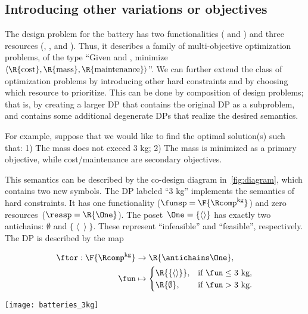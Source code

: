\subsection{Introducing other variations or objectives}

The design problem for the battery has two functionalities (
and ) and three resources (, ,
and ). Thus, it describes a family of multi-objective
optimization problems, of the type ``Given  and ,
minimize $\left\langle \R{\text{cost}},\R{\text{mass}},\R{\text{maintenance}}\right\rangle $''.
We can further extend the class of optimization problems by introducing
other hard constraints and by choosing which resource to prioritize.
This can be done by composition of design problems; that is, by creating
a larger DP that contains the original DP as a subproblem, and contains
some additional degenerate DPs that realize the desired semantics.

For example, suppose that we would like to find the optimal solution(s)
such that: 1) The mass does not exceed 3 kg; 2) The mass is minimized
as a primary objective, while cost/maintenance are secondary objectives.

This semantics can be described by the co-design diagram in~\cref{fig:diagram},
which contains two new symbols. The DP labeled ``3 kg'' implements
the semantics of hard constraints. It has one functionality ($\funsp=\F{\Rcomp^{\text{kg}}}$)
and zero resources~($\ressp=\R{\One}$). The poset~$\One=\{\left\langle \right\rangle \}$
has exactly two antichains: $\emptyset$ and $\{\left\langle \right\rangle \}$.
These represent ``infeasible'' and ``feasible'', respectively.
The DP is described by the map

\quad\quad
\begin{minipage}[c]{5cm}
  \begin{align*}
    \ftor:\F{\Rcomp^{\text{kg}}} & \rightarrow\R{\antichains\One},\\
    \fun& \mapsto\begin{cases}
                   \R{\{\left\langle \right\rangle \}}, & \text{if }\fun\leq\text{3 kg},\\
                   \R{\emptyset}, & \text{if }\fun>\text{3 kg}.
    \end{cases}
  \end{align*}

\end{minipage}\quad\texttt{[image: batteries\_3kg]}

